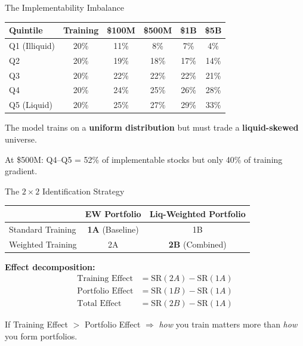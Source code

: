 \documentclass[10pt]{beamer}
\newcommand{\SR}{\mathrm{SR}}
\newcommand{\myfontsize}{\fontsize{8}{9.5}\selectfont}
\begin{document}

\begin{frame}{The Implementability Imbalance}
\myfontsize
\begin{table}
\centering
\begin{tabular}{l ccccc}
\toprule
Quintile & Training & \$100M & \$500M & \$1B & \$5B \\
\midrule
Q1 (Illiquid) & 20\% & 11\% & 8\% & 7\% & 4\% \\
Q2 & 20\% & 19\% & 18\% & 17\% & 14\% \\
Q3 & 20\% & 22\% & 22\% & 22\% & 21\% \\
Q4 & 20\% & 24\% & 25\% & 26\% & 28\% \\
Q5 (Liquid) & 20\% & 25\% & 27\% & 29\% & 33\% \\
\bottomrule
\end{tabular}
\end{table}

\vspace{0.5em}
The model trains on a \textbf{uniform distribution} but must trade a \textbf{liquid-skewed} universe.

At \$500M: Q4--Q5 = 52\% of implementable stocks but only 40\% of training gradient.
\end{frame}



\begin{frame}{The $2\times 2$ Identification Strategy}
\begin{table}
\centering
\begin{tabular}{l cc}
\toprule
 & EW Portfolio & Liq-Weighted Portfolio \\
\midrule
Standard Training & \textbf{1A} (Baseline) & 1B \\
Weighted Training & 2A & \textbf{2B} (Combined) \\
\bottomrule
\end{tabular}
\end{table}

\vspace{1em}
\textbf{Effect decomposition:}
\begin{align*}
\text{Training Effect} &= \SR(2A) - \SR(1A) \\
\text{Portfolio Effect} &= \SR(1B) - \SR(1A) \\
\text{Total Effect} &= \SR(2B) - \SR(1A)
\end{align*}

If Training Effect $>$ Portfolio Effect $\Rightarrow$ \textit{how} you train matters more than \textit{how} you form portfolios.
\end{frame}
\end{document}
